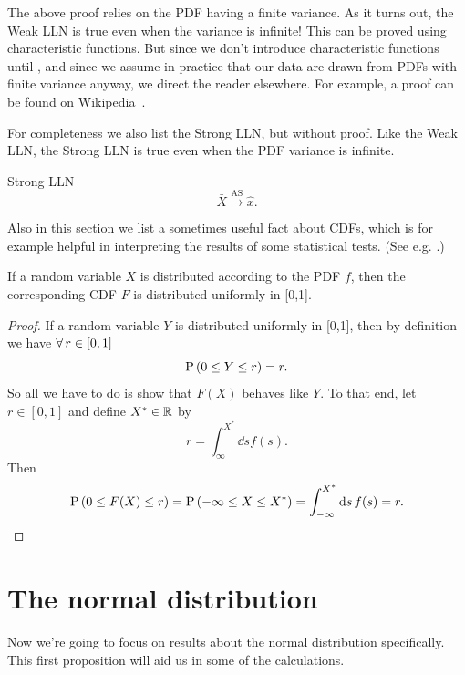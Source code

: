 The above proof relies on the PDF having a finite
variance. As it turns out, the Weak LLN is true
even when the variance is infinite! This can be proved
using characteristic functions. But since we don't introduce characteristic
functions until , and since we assume in practice
that our data are drawn from PDFs with finite variance anyway,
we direct the reader elsewhere. For example, a proof can be
found on Wikipedia~\cite{Wiki_LLN}.

For completeness we also list the Strong LLN, but without proof. 
Like the Weak LLN, the Strong LLN is true even when the PDF variance
is infinite.

\begin{theorem}{Strong LLN}{}
  $$
    \bar{X}\xrightarrow{\text{AS}}\hat{x}.
  $$
\end{theorem}

Also in this section we list a sometimes useful fact about CDFs, which is
for example helpful in interpreting the results of some statistical
tests. (See e.g. .) 

\begin{proposition}{}{}
  If a random variable $X$ is distributed according to the PDF $f$, then
  the corresponding CDF $F$ is distributed uniformly in [0,1].
  \begin{proof}
    If a random variable $Y$ is distributed uniformly in [0,1], then
    by definition we have $\operatorname{\forall} r\in [0,1]$
    $$
      \operatorname{P}\left(0\leq Y\leq r\right)=r.
    $$
    So all we have to do is show that $F(X)$ behaves like $Y$. To that end,
    let $r\in[0,1]$ and define $X^*\in\mathbb{R}$ by
    $$
      r=\int_\infty^{X^*}\dd{s}f(s).
    $$
    Then
    $$
      \operatorname{P}\left(0\leq F(X)\leq r\right)
      =\operatorname{P}\left(-\infty\leq X\leq X^*\right)
      =\int_{-\infty}^{X^*}\dd{s}f(s)
      =r.
    $$
  \end{proof}
\end{proposition}

\section{The normal distribution}
Now we're going to focus on results about the normal distribution specifically.
This first proposition will aid us in some of the calculations.


